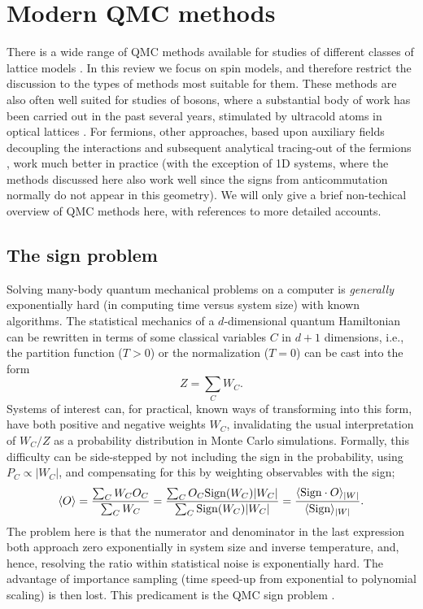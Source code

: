 \documentclass[range]{ar2e}
\begin{document}
\section{Modern QMC methods}
\label{sec:methods}

There is a wide range of QMC methods available for studies of different classes of lattice models \cite{Assaad07,Evertz03,Sandvik10b}. In this review we 
focus on spin models, and therefore restrict the discussion to the types of methods most suitable for them. These methods are also often well suited 
for studies of bosons, where a substantial body of work has been carried out in the past several years, stimulated by ultracold atoms in optical 
lattices \cite{Kashurnikov02,Wessel04,Kato08,Pollet10}. For fermions, other approaches, based upon auxiliary fields decoupling the interactions and 
subsequent analytical tracing-out of the fermions \cite{Hirsch82,Assaad07}, work much better in practice (with the exception of 1D systems, where the methods 
discussed here also work well since the signs from anticommutation normally do not appear in this geometry). We will only give a brief non-techical 
overview of QMC methods here, with references to more detailed accounts.

\subsection{The sign problem}
\label{ss:sign}

Solving many-body quantum mechanical problems on a computer is {\em generally} exponentially hard (in computing time versus system size) 
with known algorithms. The statistical mechanics of a $d$-dimensional quantum Hamiltonian can be rewritten in terms of some classical variables 
$C$ in $d+1$ dimensions, i.e., the partition function ($T>0$) or the normalization ($T=0$) can be cast into the form
\begin{equation}
\label{eq:wc}
Z=\sum_C W_C.
\end{equation}
Systems of interest can, for practical, known ways of transforming into this form, have both positive and negative weights $W_C$, 
invalidating the usual interpretation of $W_C/Z$ as a probability distribution in Monte Carlo simulations. Formally, this difficulty 
can be side-stepped by not including the sign in the probability, using $P_C \propto |W_C|$, and compensating for this by weighting 
observables with the sign;
\begin{equation}
\langle O \rangle = \frac{\sum_C W_C O_C}{\sum_C W_C} =
\frac{\sum_C O_C {\rm Sign}(W_C) |W_C|}{\sum_C {\rm Sign}(W_C)|W_C|} = 
\frac{\langle {\rm Sign} \cdot O\rangle_{|W|}}{\langle {\rm Sign}\rangle_{|W|}}.
\label{expvalue}
\end{equation}
The problem here is that the numerator and denominator in the last expression both approach zero
exponentially in system size and inverse temperature, and, hence, resolving the ratio within 
statistical noise is exponentially hard. The advantage of importance sampling (time speed-up from exponential 
to polynomial scaling) is then lost. This predicament is the QMC sign problem \cite{Loh90,Henelius00,Nyfeler08}.
\end{document}
